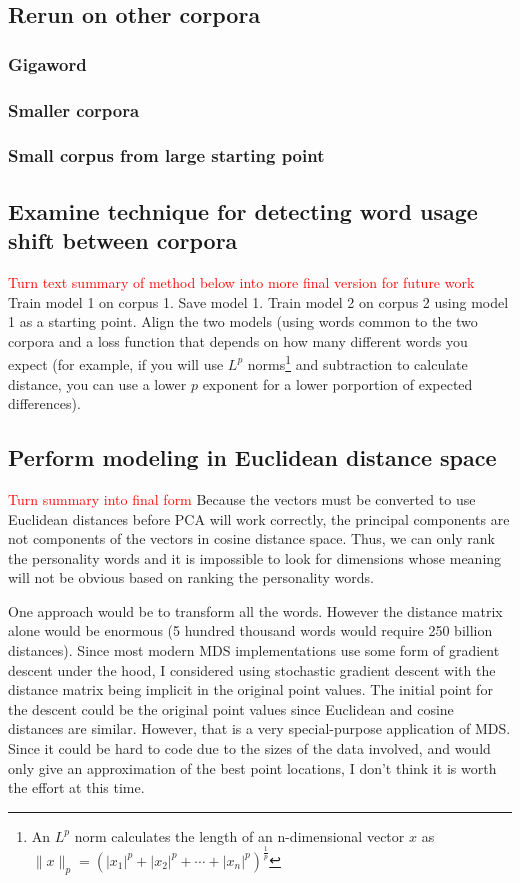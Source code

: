 \documentclass[10pt,letterpaper]{article}
\newcommand{\todo}[1]{\textcolor{red}{#1}}
\begin{document}
\subsection{Rerun on other corpora}

\subsubsection{Gigaword}
\subsubsection{Smaller corpora}
\subsubsection{Small corpus from large starting point}

\subsection{Examine technique for detecting word usage shift between corpora}

\todo{Turn text summary of method below into more final version for future work}
Train model 1 on corpus 1. Save model 1. Train model 2 on corpus 2 using model 1 as a starting point. Align the two models (using words common to the two corpora and a loss function that depends on how many different words you expect (for example, if you will use $L^p$ norms\footnote{An $L^p$ norm calculates the length of an n-dimensional vector $x$ as $\|x\|_p=\left(|x_1|^p+|x_2|^p+\dotsb+|x_n|^p\right)^{\frac{1}{p}}$} and subtraction to calculate distance, you can use a lower $p$ exponent for a lower porportion of expected differences).

\subsection{Perform modeling in Euclidean distance space}

\todo{Turn summary into final form}
Because the vectors must be converted to use Euclidean distances before PCA will work correctly, the principal components are not components of the vectors in cosine distance space. Thus, we can only rank the personality words and it is impossible to look for dimensions whose meaning will not be obvious based on ranking the personality words.

One approach would be to transform all the words. However the distance matrix alone would be enormous (5 hundred thousand words would require 250 billion distances). Since most modern MDS implementations use some form of gradient descent under the hood, I considered using stochastic gradient descent with the distance matrix being implicit in the original point values. The initial point for the descent could be the original point values since Euclidean and cosine distances are similar. However, that is a very special-purpose application of MDS. Since it could be hard to code due to the sizes of the data involved, and would only give an approximation of the best point locations, I don't think it is worth the effort at this time.
\end{document}
